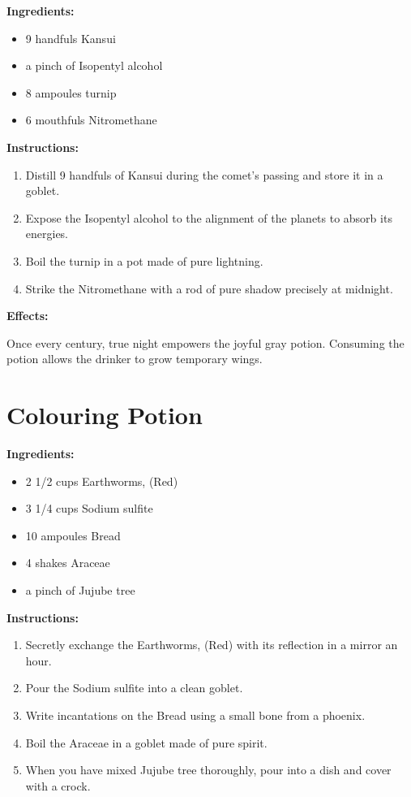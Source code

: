 \documentclass{article}
\begin{document}
\textbf{Ingredients:}

\begin{itemize}
  \item 9 handfuls Kansui
  \item a pinch of Isopentyl alcohol
  \item 8 ampoules turnip
  \item 6 mouthfuls Nitromethane
\end{itemize}

\textbf{Instructions:}

\begin{enumerate}
  \item Distill 9 handfuls of Kansui during the comet’s passing and store it in a goblet.
  \item Expose the Isopentyl alcohol to the alignment of the planets to absorb its energies.
  \item Boil the turnip in a pot made of pure lightning.
  \item Strike the Nitromethane with a rod of pure shadow precisely at midnight.
\end{enumerate}

\textbf{Effects:}

Once every century, true night empowers the joyful gray potion. Consuming the potion allows the drinker to grow temporary wings.

\newpage
\section*{Colouring Potion}

\textbf{Ingredients:}

\begin{itemize}
  \item 2 1/2 cups Earthworms, (Red)
  \item 3 1/4 cups Sodium sulfite
  \item 10 ampoules Bread
  \item 4 shakes Araceae
  \item a pinch of Jujube tree
\end{itemize}

\textbf{Instructions:}

\begin{enumerate}
  \item Secretly exchange the Earthworms, (Red) with its reflection in a mirror an hour.
  \item Pour the Sodium sulfite into a clean goblet.
  \item Write incantations on the Bread using a small bone from a phoenix.
  \item Boil the Araceae in a goblet made of pure spirit.
  \item When you have mixed Jujube tree thoroughly, pour into a dish and cover with a crock.
\end{enumerate}
\end{document}
